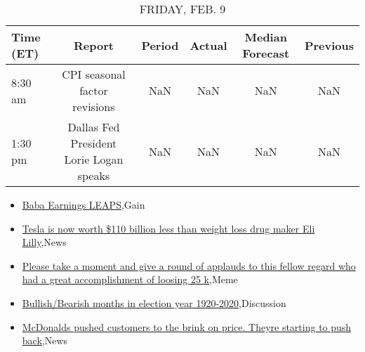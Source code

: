 \documentclass{article}%
\begin{document}
%


\begin{table}[htbp]%
\caption{FRIDAY, FEB. 9}%
\centering%
\begin{adjustbox}{width=1\textwidth}%
\begin{tabular}{lccccc}
\toprule
Time (ET) &                                  Report & Period & Actual & Median Forecast & Previous \\
\midrule
  8:30 am &           CPI seasonal factor revisions &    NaN &    NaN &             NaN &      NaN \\
  1:30 pm & Dallas Fed President Lorie Logan speaks &    NaN &    NaN &             NaN &      NaN \\
\bottomrule
\end{tabular}
%
\end{adjustbox}%
\end{table}

%
\begin{itemize}%
\item%
\href{https://reddit.com/r/wallstreetbets/comments/1akv0s7/baba\_earnings\_leaps/}{Baba Earnings LEAPS},Gain%
\item%
\href{https://reddit.com/r/wallstreetbets/comments/1aku6rg/tesla\_is\_now\_worth\_110\_billion\_less\_than\_weight/}{Tesla is now worth \$110 billion less than weight loss drug maker Eli Lilly},News%
\item%
\href{https://reddit.com/r/wallstreetbets/comments/1aku1s5/please\_take\_a\_moment\_and\_give\_a\_round\_of\_applauds/}{Please take a moment and give a round of applauds to this fellow regard who had a great accomplishment of loosing 25 k},Meme%
\item%
\href{https://reddit.com/r/StockMarket/comments/1akfqq3/bullishbearish\_months\_in\_election\_year\_19202020/}{Bullish/Bearish months in election year 1920-2020},Discussion%
\item%
\href{https://reddit.com/r/Economics/comments/1akwrqx/mcdonalds\_pushed\_customers\_to\_the\_brink\_on\_price/}{McDonalds pushed customers to the brink on price. Theyre starting to push back},News%
\end{itemize}%
\end{document}
